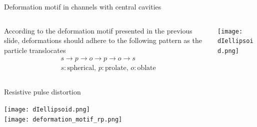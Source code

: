 \begin{frame}[c]{Deformation motif in channels with central cavities}

		\begin{columns}[t]
			\begin{column}[T]{2.25in}
				According to the deformation motif presented in the previous slide, deformations should adhere to the following pattern as the particle translocates \\
				
				\begin{equation*}
					\begin{split}
						&s\rightarrow p\rightarrow o\rightarrow p\rightarrow o\rightarrow s \\
						&s: \mathrm{spherical},\,p: \mathrm{prolate},\,o:\mathrm{oblate}
					\end{split}
				\end{equation*}
				
			\end{column}


			\begin{column}[T]{2.25in}
				{\centering
					\texttt{[image: dIellipsoid.png]} \\
					\par
				}
			\end{column}
		
	\end{columns}
			

\end{frame}



\begin{frame}[c]{Resistive pulse distortion}

	{\centering
		\texttt{[image: dIellipsoid.png]} \\
		\vspace{0.1in}
		\texttt{[image: deformation\_motif\_rp.png]} \\
		\par
	}


\end{frame}




